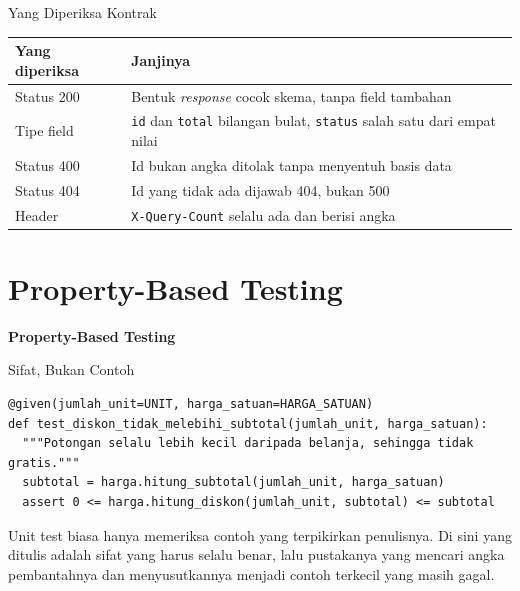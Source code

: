 \documentclass[aspectratio=169, table, 12pt]{beamer}
\begin{document}
\begin{frame}{{\Large Yang Diperiksa Kontrak}}
  \vspace{6pt}
  \centering
  {\footnotesize
  \begin{tabularx}{\textwidth}{lY}
    \hline
    \textbf{Yang diperiksa} & \textbf{Janjinya} \\
    \hline
    Status 200 & Bentuk \textit{response} cocok skema, tanpa field tambahan \\
    \hline
    Tipe field & \texttt{id} dan \texttt{total} bilangan bulat, \texttt{status} salah satu dari empat nilai \\
    \hline
    Status 400 & Id bukan angka ditolak tanpa menyentuh basis data \\
    \hline
    Status 404 & Id yang tidak ada dijawab 404, bukan 500 \\
    \hline
    Header & \texttt{X-Query-Count} selalu ada dan berisi angka \\
    \hline
  \end{tabularx}}
\end{frame}

\section{Property-Based Testing}

\begin{frame}{\hfill}
  \centering
  \Huge{\textbf{Property-Based Testing}}
\end{frame}

\begin{frame}[fragile]{{\Large Sifat, Bukan Contoh}}
  \vspace{2pt}
\begin{lstlisting}[style=PythonStyle]
@given(jumlah_unit=UNIT, harga_satuan=HARGA_SATUAN)
def test_diskon_tidak_melebihi_subtotal(jumlah_unit, harga_satuan):
  """Potongan selalu lebih kecil daripada belanja, sehingga tidak gratis."""
  subtotal = harga.hitung_subtotal(jumlah_unit, harga_satuan)
  assert 0 <= harga.hitung_diskon(jumlah_unit, subtotal) <= subtotal
\end{lstlisting}
  \vspace{4pt}
  {\small Unit test biasa hanya memeriksa contoh yang terpikirkan penulisnya.
  Di sini yang ditulis adalah sifat yang harus selalu benar, lalu pustakanya
  yang mencari angka pembantahnya dan menyusutkannya menjadi contoh terkecil
  yang masih gagal.}
\end{frame}
\end{document}

